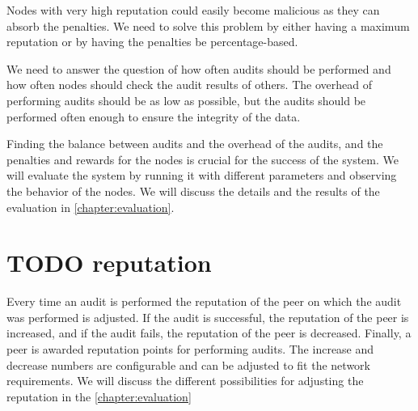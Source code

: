 Nodes with very high reputation could easily become malicious as they can absorb the penalties.
We need to solve this problem by either having a maximum reputation or by having the penalties be
percentage-based.

We need to answer the question of how often audits should be performed and how often nodes should
check the audit results of others.
The overhead of performing audits should be as low as possible, but the audits should be performed often enough
to ensure the integrity of the data.

Finding the balance between audits and the overhead of the audits, and the penalties and rewards for the nodes
is crucial for the success of the system.
We will evaluate the system by running it with different parameters and observing the behavior of the nodes.
We will discuss the details and the results of the evaluation in \ref{chapter:evaluation}.

\section{TODO reputation}
Every time an audit is performed the reputation of the peer on which the audit was performed is adjusted.
If the audit is successful, the reputation of the peer is increased,
and if the audit fails, the reputation of the peer is decreased.
Finally, a peer is awarded reputation points for performing audits.
The increase and decrease numbers are configurable and can be adjusted to fit the network requirements.
We will discuss the different possibilities for adjusting the reputation in the \autoref{chapter:evaluation}
